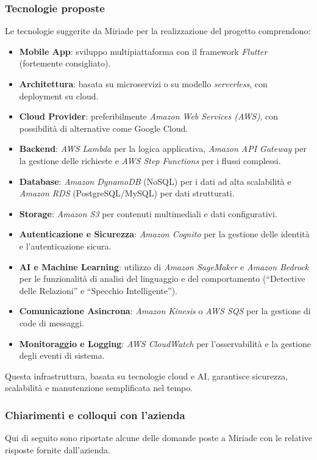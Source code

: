 \documentclass[a4paper,11pt]{article}
\begin{document}
\subsubsection{Tecnologie proposte}
Le tecnologie suggerite da Miriade per la realizzazione del progetto comprendono:
\begin{itemize}
    \item \textbf{Mobile App}: sviluppo multipiattaforma con il framework \textit{Flutter} (fortemente consigliato).
    \item \textbf{Architettura}: basata su microservizi o su modello \textit{serverless}, con deployment su cloud.
    \item \textbf{Cloud Provider}: preferibilmente \textit{Amazon Web Services (AWS)}, con possibilità di alternative come Google Cloud.
    \item \textbf{Backend}: \textit{AWS Lambda} per la logica applicativa, \textit{Amazon API Gateway} per la gestione delle richieste e \textit{AWS Step Functions} per i flussi complessi.
    \item \textbf{Database}: \textit{Amazon DynamoDB} (NoSQL) per i dati ad alta scalabilità e \textit{Amazon RDS} (PostgreSQL/MySQL) per dati strutturati.
    \item \textbf{Storage}: \textit{Amazon S3} per contenuti multimediali e dati configurativi.
    \item \textbf{Autenticazione e Sicurezza}: \textit{Amazon Cognito} per la gestione delle identità e l’autenticazione sicura.
    \item \textbf{AI e Machine Learning}: utilizzo di \textit{Amazon SageMaker} e \textit{Amazon Bedrock} per le funzionalità di analisi del linguaggio e del comportamento (``Detective delle Relazioni'' e ``Specchio Intelligente'').
    \item \textbf{Comunicazione Asincrona}: \textit{Amazon Kinesis} o \textit{AWS SQS} per la gestione di code di messaggi.
    \item \textbf{Monitoraggio e Logging}: \textit{AWS CloudWatch} per l’osservabilità e la gestione degli eventi di sistema.
\end{itemize}
Questa infrastruttura, basata su tecnologie cloud e AI, garantisce sicurezza, scalabilità e manutenzione semplificata nel tempo.

\subsubsection{Chiarimenti e colloqui con l'azienda}
Qui di seguito sono riportate alcune delle domande poste a Miriade con le relative risposte fornite dall'azienda. 
\end{document}
